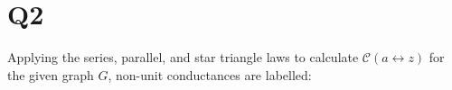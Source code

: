 \documentclass[a4paper, 11pt]{article}
\def\set#1{\left\{ #1 \right\}}
\begin{document}
\pagebreak
\section*{Q2}
Applying the series, parallel, and star triangle laws to calculate $\mathcal{C}(a\leftrightarrow z)$ for the given graph $G$, non-unit conductances are labelled:
\end{document}
